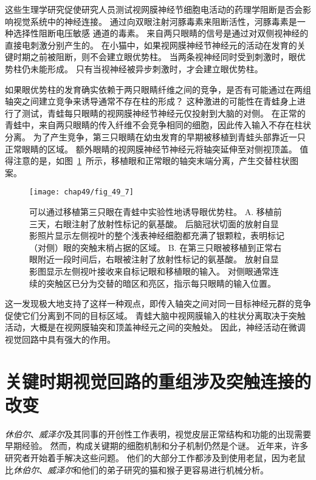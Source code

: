 这些生理学研究促使研究人员测试视网膜神经节细胞电活动的药理学阻断是否会影响视觉系统中的神经连接。
通过向双眼注射河豚毒素来阻断活性，河豚毒素是一种选择性阻断电压敏感  通道的毒素。
来自两只眼睛的信号是通过对双侧视神经的直接电刺激分别产生的。
在小猫中，如果视网膜神经节神经元的活动在发育的关键时期之前被阻断，则不会建立眼优势柱。
当两条视神经同时受到刺激时，眼优势柱仍未能形成。
只有当视神经被异步刺激时，才会建立眼优势柱。


如果眼优势柱的发育确实依赖于两只眼睛纤维之间的竞争，是否有可能通过在两组轴突之间建立竞争来诱导通常不存在柱的形成？
这种激进的可能性在青蛙身上进行了测试，青蛙每只眼睛的视网膜神经节神经元仅投射到大脑的对侧。
在正常的青蛙中，来自两只眼睛的传入纤维不会竞争相同的细胞，因此传入输入不存在柱状分离。
为了产生竞争，第三只眼睛在幼虫发育的早期被移植到青蛙头部靠近一只正常眼睛的区域。
额外眼睛的视网膜神经节神经元将轴突延伸至对侧视顶盖。
值得注意的是，如图~\ref{fig:49_7}~所示，移植眼和正常眼的轴突末端分离，产生交替柱状图案。


\begin{figure}[htbp]
	\centering
	\texttt{[image: chap49/fig\_49\_7]}
	\caption{可以通过移植第三只眼在青蛙中实验性地诱导眼优势柱\cite{constantine1978eye}。
		A. 移植前三天，右眼注射了放射性标记的氨基酸。
		后脑冠状切面的放射自显影照片显示左侧视叶的整个浅表神经细胞都充满了银颗粒，表明标记（对侧）眼的突触末梢占据的区域。
		B. 在第三只眼被移植到正常右眼附近一段时间后，右眼被注射了放射性标记的氨基酸。
		放射自显影图显示左侧视叶接收来自标记眼和移植眼的输入。
		对侧眼通常连续的突触区已分为交替的暗区和亮区，指示每只眼睛的输入位置。}
	\label{fig:49_7}
\end{figure}


这一发现极大地支持了这样一种观点，即传入轴突之间对同一目标神经元群的竞争促使它们分离到不同的目标区域。
青蛙大脑中视网膜输入的柱状分离取决于突触活动，大概是在视网膜轴突和顶盖神经元之间的突触处。
因此，神经活动在微调视觉回路中具有强大的作用。



\section{关键时期视觉回路的重组涉及突触连接的改变}

\textit{休伯尔}、\textit{威泽尔}及其同事的开创性工作表明，视觉皮层正常结构和功能的出现需要早期经验。
然而，构成关键期的细胞机制和分子机制仍然是个谜。
近年来，许多研究者开始着手解决这些问题。
他们的大部分工作都涉及到使用老鼠，因为老鼠比\textit{休伯尔}、\textit{威泽尔}和他们的弟子研究的猫和猴子更容易进行机械分析。


